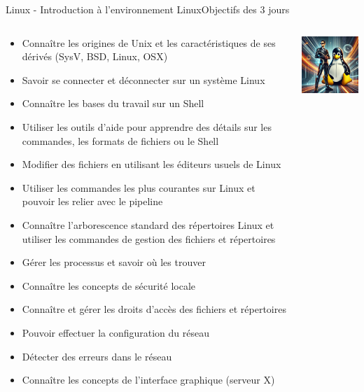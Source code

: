 \documentclass{beamer}
\begin{document}
    \begin{frame}{Linux - Introduction à l'environnement Linux}{Objectifs des 3 jours}
        \begin{columns}
            \begin{scriptsize}
                \begin{itemize}
                    \item Connaître les origines de Unix et les caractéristiques de ses dérivés (SysV, BSD, Linux, OSX)
                    \item Savoir se connecter et déconnecter sur un système Linux
                    \item Connaître les bases du travail sur un Shell
                    \item Utiliser les outils d'aide pour apprendre des détails sur les commandes, les formats de fichiers ou le Shell
                    \item Modifier des fichiers en utilisant les éditeurs usuels de Linux
                    \item Utiliser les commandes les plus courantes sur Linux et pouvoir les relier avec le pipeline
                    \item Connaître l'arborescence standard des répertoires Linux et utiliser les commandes de gestion des fichiers et répertoires
                    \item Gérer les processus et savoir où les trouver
                    \item Connaître les concepts de sécurité locale
                    \item Connaître et gérer les droits d'accès des fichiers et répertoires
                    \item Pouvoir effectuer la configuration du réseau
                    \item Détecter des erreurs dans le réseau
                    \item Connaître les concepts de l'interface graphique (serveur X)
                \end{itemize}
            \end{scriptsize}
            \includegraphics[width=4cm]{image/IT-man-and-penguin}
        \end{columns}
    \end{frame}
\end{document}
